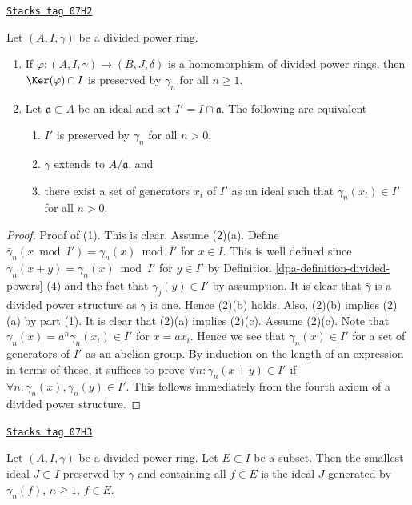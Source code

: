 \begin{lemma}[Kernel]
\label{dpa-lemma-kernel}
\href{https://stacks.math.columbia.edu/tag/07H2}{\texttt{Stacks tag 07H2}}

Let $(A, I, \gamma)$ be a divided power ring.
\begin{enumerate}
\item If $\varphi : (A, I, \gamma) \to (B, J, \delta)$ is a
homomorphism of divided power rings, then $\Ker(\varphi) \cap I$
is preserved by $\gamma_n$ for all $n \geq 1$.
\item Let $\mathfrak a \subset A$ be an ideal and set
$I' = I \cap \mathfrak a$. The following are equivalent
\begin{enumerate}
\item $I'$ is preserved by $\gamma_n$ for all $n > 0$,
\item $\gamma$ extends to $A/\mathfrak a$, and
\item there exist a set of generators $x_i$ of $I'$ as an ideal
such that $\gamma_n(x_i) \in I'$ for all $n > 0$.
\end{enumerate}
\end{enumerate}
\end{lemma}

\begin{proof}

Proof of (1). This is clear. Assume (2)(a). Define
$\bar\gamma_n(x \bmod I') = \gamma_n(x) \bmod I'$ for $x \in I$.
This is well defined since $\gamma_n(x + y) = \gamma_n(x) \bmod I'$
for $y \in I'$ by Definition \ref{dpa-definition-divided-powers} (4) and
the fact that $\gamma_j(y) \in I'$ by assumption. It is clear that
$\bar\gamma$ is a divided power structure as $\gamma$ is one.
Hence (2)(b) holds. Also, (2)(b) implies (2)(a) by part (1).
It is clear that (2)(a) implies (2)(c). Assume (2)(c).
Note that $\gamma_n(x) = a^n\gamma_n(x_i) \in I'$ for $x = ax_i$.
Hence we see that $\gamma_n(x) \in I'$ for a set of generators of $I'$
as an abelian group. By induction on the length of an expression in
terms of these, it suffices to prove $\forall n : \gamma_n(x + y) \in I'$
if $\forall n : \gamma_n(x), \gamma_n(y) \in I'$. This
follows immediately from the fourth axiom of a divided power structure.
\end{proof}

\begin{lemma}
\label{dpa-lemma-sub-dp-ideal}
\href{https://stacks.math.columbia.edu/tag/07H3}{\texttt{Stacks tag 07H3}}

Let $(A, I, \gamma)$ be a divided power ring.
Let $E \subset I$ be a subset.
Then the smallest ideal $J \subset I$ preserved by $\gamma$
and containing all $f \in E$ is the ideal $J$ generated by
$\gamma_n(f)$, $n \geq 1$, $f \in E$.
\end{lemma}


